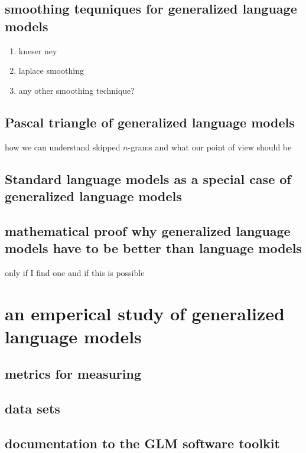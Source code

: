 \documentclass[•]{book}
\begin{document}
\section{smoothing tequniques for generalized language models}
\begin{enumerate}
\item kneser ney
\item laplace smoothing
\item any other smoothing technique?
\end{enumerate}
\section{Pascal triangle of generalized language models}
how we can understand skipped $n$-grams and what our point of view should be

\section{Standard language models as a special case of generalized language models}

\section{mathematical proof why generalized language models have to be better than language models}
only if I find one and if this is possible


\chapter{an emperical study of generalized language models}
\section{metrics for measuring}
\section{data sets}
\section{documentation to the GLM software toolkit}
\end{document}
